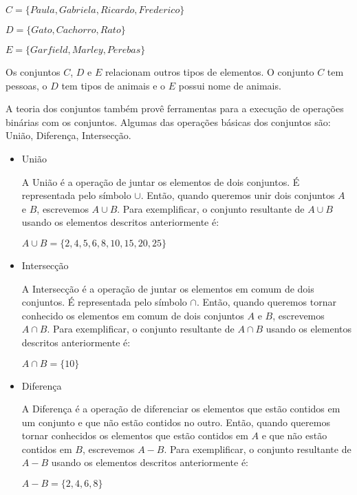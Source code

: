 \begin{exmp}
$C = \{Paula, Gabriela, Ricardo, Frederico\}$\par
$D = \{Gato, Cachorro, Rato\}$\par
$E = \{Garfield, Marley, Perebas\} $\\
	
\end{exmp}

Os conjuntos $C$, $D$ e $E$ relacionam outros tipos de elementos. O conjunto $C$ tem pessoas, o $D$ tem tipos de animais e o $E$ possui nome de animais.\par
A teoria dos conjuntos também provê ferramentas para a execução de operações binárias com os conjuntos. Algumas das operações básicas dos conjuntos são: União, Diferença, Intersecção. 

\begin{itemize}
	\item União
	
	A União é a operação de juntar os elementos de dois conjuntos. É representada pelo símbolo $\cup$. Então, quando queremos unir dois conjuntos $A$ e $B$, escrevemos $A \cup B$.
	Para exemplificar, o conjunto resultante de $A \cup B$ usando os elementos descritos anteriormente é:\\
	\begin{exmp}
		
		$A \cup B = \{ 2, 4, 5, 6, 8, 10, 15, 20, 25\}$
	\end{exmp} 
	\newpage
	
	\item Intersecção
	
	A Intersecção é a operação de juntar os elementos em comum de dois conjuntos. É representada pelo símbolo $\cap$. Então, quando queremos tornar conhecido os elementos em comum de dois conjuntos $A$ e $B$, escrevemos $A \cap B$. Para exemplificar, o conjunto resultante de $A \cap B$ usando os elementos descritos anteriormente é:\\
	
	\begin{exmp}
		$A \cap B = \{10\}$
	\end{exmp}
	\item Diferença
	
	A Diferença é a operação de diferenciar os elementos que estão contidos em um conjunto e que não estão contidos no outro. Então, quando queremos tornar conhecidos os elementos que estão contidos em $A$ e que não estão contidos em $B$, escrevemos $A - B$. Para exemplificar, o conjunto resultante de $A - B$ usando os elementos descritos anteriormente é:
	
	\begin{exmp}
		$A - B = \{ 2, 4, 6, 8\}$
	\end{exmp}
		
\end{itemize}

